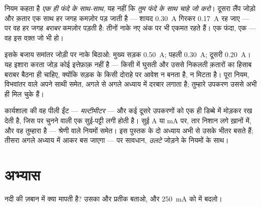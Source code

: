 \begin{example}[नियम की बारीक इबारत पढ़ना]\label{ex:g8:intensity-ammeter:fineprint}
नियम कहता है \emph{एक ही फंदे के साथ-साथ}, यह नहीं कि \emph{तुम फंदे
के साथ चाहे जो करो}।  दूसरा लैंप जोड़ो और क़तार एक साथ हर
जगह कमज़ोर पड़ जाती है --- शायद \qty{0.30}{A} गिरकर \qty{0.17}{A} रह
जाए --- पर वह हर जगह \emph{बराबर} कमज़ोर पड़ती है: तीनों नाके नए अंक
पर भी एकमत रहते हैं। एक फंदा, एक  --- वह  इस वक़्त जो भी
हो।
\end{example}

\begin{example}[संधि पर एक नज़र]\label{ex:g8:intensity-ammeter:junction}
इसके बजाय समांतर जोड़ी पर नाके बिठाओ: मुख्य सड़क \qty{0.50}{A}; पहली
 \qty{0.30}{A}; दूसरी  \qty{0.20}{A}। यह इशारा करता जोड़ कोई
इत्तेफ़ाक़ नहीं है --- किसी  में घुसती और उससे निकलती क़तारों का
हिसाब बराबर बैठना ही चाहिए, क्योंकि सड़क के किसी दोराहे पर आवेश न
बनता है, न मिटता है। पूरा नियम, विभवांतर वाले अपने साथी समेत, अगले से
अगले अध्याय में दरबार लगाता है; तुम्हारे उपकरण उससे अभी ही मिल चुके
हैं।
\end{example}

\begin{remark}[मल्टीमीटर]\label{rem:g8:intensity-ammeter:multimeter}
कार्यशाला की वह पीली ईंट --- \emph{मल्टीमीटर} ---  और कई दूसरे
उपकरणों को एक ही डिब्बे में मोड़कर रख देती है, जिस पर चुनने वाली एक
सुई-पट्टी लगी होती है। सुई \unit{A} या \unit{mA} पर, तार निशान लगे
ख़ानों में, और वह तुम्हारा  है --- श्रेणी वाले नियमों समेत। इस
पुस्तक के दो अध्याय अभी से उसके भीतर बसते हैं; तीसरा अगले अध्याय में
आकर बस जाएगा --- पर सावधान, \emph{उलटे} जोड़ने के नियमों के साथ।
\end{remark}

\section{अभ्यास}

\begin{exercise}[$\star$]\label{exo:g8:intensity-ammeter:1}
नदी की ज़बान में  क्या मापती है? उसका  और प्रतीक बताओ,
और \qty{250}{mA} को  में बदलो।
\end{exercise}

